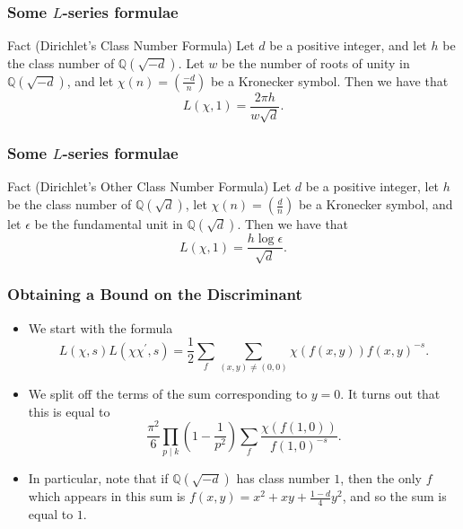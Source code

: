 \documentclass{beamer}
\newcommand{\legendre}[2]{\ensuremath{\left(\frac{#1}{#2}\right)}}
\begin{document}
\begin{frame}

	\frametitle{Some $L$-series formulae}

	\begin{block}{Fact (Dirichlet's Class Number Formula)}
		Let $d$ be a positive integer, and let $h$ be the class number of $\mathbb{Q}(\sqrt{-d})$. Let $w$ be the number of roots of unity in $\mathbb{Q}(\sqrt{-d})$, and let $\chi(n) = \legendre{-d}{n}$ be a Kronecker symbol. Then we have that
		\[
			L(\chi, 1) = \frac{2 \pi h}{w \sqrt{d}}.
		\]
	\end{block}

\end{frame}

\begin{frame}

	\frametitle{Some $L$-series formulae}

	\begin{block}{Fact (Dirichlet's Other Class Number Formula)}
		Let $d$ be a positive integer, let $h$ be the class number of $\mathbb{Q}(\sqrt{d})$, let $\chi(n) = \legendre{d}{n}$ be a Kronecker symbol, and let $\epsilon$ be the fundamental unit in $\mathbb{Q}(\sqrt{d})$. Then we have that
		\[
			L(\chi, 1) = \frac{h \log \epsilon}{\sqrt{d}}.
		\]
	\end{block}
\end{frame}


\begin{frame}
	
	\frametitle{Obtaining a Bound on the Discriminant}

	\begin{itemize}
		
		\item We start with the formula
			\[
				L(\chi, s)L(\chi \chi^\prime, s) = \frac{1}{2} \sum_{f} \sum_{(x, y) \neq (0, 0)} \chi(f(x, y)) {f(x, y)}^{-s}.
			\]
			\pause

		\item We split off the terms of the sum corresponding to $y = 0$. It turns out that this is equal to
			\[
				\frac{\pi^2}{6} \prod_{p \mid k} \left(1 - \frac{1}{p^2} \right) \sum_{f} \frac{\chi(f(1, 0))}{{f(1, 0)}^{-s}}.
			\]
			\pause

		\item In particular, note that if $\mathbb{Q}(\sqrt{-d})$ has class number $1$, then the only $f$ which appears in this sum is $f(x, y) = x^2 + xy + \frac{1 - d}{4} y^2$, and so the sum is equal to $1$.

	\end{itemize}

\end{frame}
\end{document}
